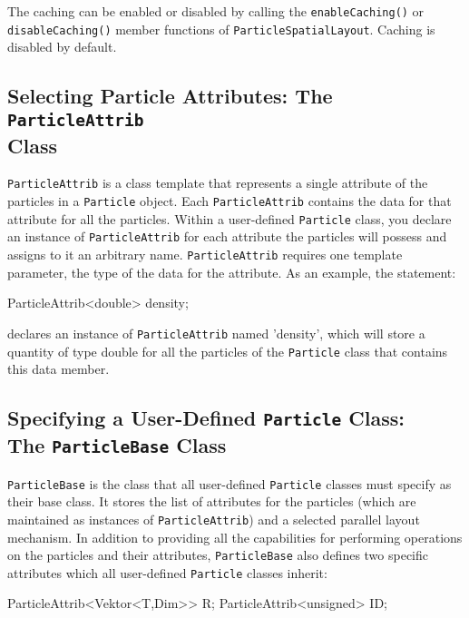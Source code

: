 The caching can be enabled or disabled by calling the \texttt{enableCaching()} or \texttt{disableCaching()} member functions of \texttt{ParticleSpatialLayout}. Caching is disabled by default.


\subsection{Selecting Particle Attributes: The \texttt{ParticleAttrib} \\Class}

\texttt{ParticleAttrib} is a class template that represents a single attribute of the particles in a \texttt{Particle} object. Each \texttt{ParticleAttrib} contains the data for that attribute for all the particles. Within a user-defined \texttt{Particle} class, you declare an instance of \texttt{ParticleAttrib} for each attribute the particles will possess and assigns to it an arbitrary name. \texttt{ParticleAttrib} requires one template parameter, the type of the data for the attribute. As an example, the statement:
\begin{smallcode}
ParticleAttrib<double> density;
\end{smallcode}

declares an instance of \texttt{ParticleAttrib} named 'density', which will store a quantity of type double for all the particles of the \texttt{Particle} class that contains this data member.

\subsection{Specifying a User-Defined \texttt{Particle} Class: \\The \texttt{ParticleBase} Class}

\texttt{ParticleBase} is the class that all user-defined \texttt{Particle} classes must specify as their base class. It stores the list of attributes for the particles (which are maintained as instances of \texttt{ParticleAttrib}) and a selected parallel layout mechanism. In addition to providing all the capabilities for performing operations on the particles and their attributes, \texttt{ParticleBase} also defines two specific attributes which all user-defined \texttt{Particle} classes inherit:
\begin{smallcode}
ParticleAttrib<Vektor<T,Dim>>  R;
ParticleAttrib<unsigned>      ID;
\end{smallcode}


